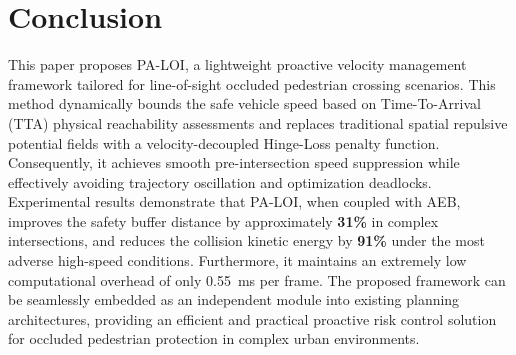 \documentclass[conference]{IEEEtran}
\begin{document}
\section{Conclusion}

This paper proposes PA-LOI, a lightweight proactive velocity management framework tailored for line-of-sight occluded pedestrian crossing scenarios. This method dynamically bounds the safe vehicle speed based on Time-To-Arrival (TTA) physical reachability assessments and replaces traditional spatial repulsive potential fields with a velocity-decoupled Hinge-Loss penalty function. Consequently, it achieves smooth pre-intersection speed suppression while effectively avoiding trajectory oscillation and optimization deadlocks. Experimental results demonstrate that PA-LOI, when coupled with AEB, improves the safety buffer distance by approximately \textbf{31\%} in complex intersections, and reduces the collision kinetic energy by \textbf{91\%} under the most adverse high-speed conditions. Furthermore, it maintains an extremely low computational overhead of only \SI{0.55}{\milli\second} per frame. The proposed framework can be seamlessly embedded as an independent module into existing planning architectures, providing an efficient and practical proactive risk control solution for occluded pedestrian protection in complex urban environments.




\end{document}
